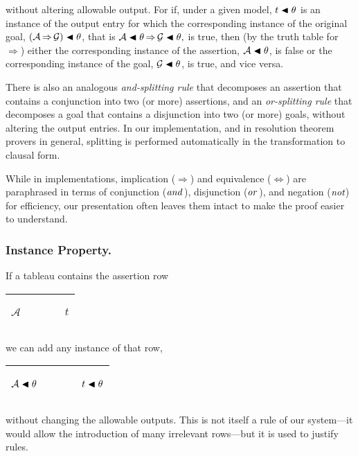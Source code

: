 \documentclass[runningheads]{llncs}
\DeclareMathOperator{\uand}{\emph{and}\,}
\DeclareMathOperator{\uor}{\emph{or}\,}
\DeclareMathOperator{\unot}{\emph{not}\kern-.0pt}
\DeclareMathOperator{\uimplies}{\Rightarrow}
\DeclareMathOperator{\uiff}{\iff}
\begin{document}
\noindent without altering allowable output. For if, under a given model, $t \blacktriangleleft \theta$ is an instance of the output entry for which the corresponding instance of the original goal, $(\mathcal{A}\uimplies\mathcal{G})\apply \theta $, that is  $\mathcal{A}\apply \theta \uimplies\mathcal{G}\apply \theta, $ is true, then (by the truth table for $\uimplies$) either the corresponding instance of the assertion, $\mathcal{A}\blacktriangleleft \theta $, is false or the corresponding instance of the goal, $\mathcal{G}\blacktriangleleft \theta $, is true, and vice versa.  

There is also an analogous
\emph{and-splitting rule} that decomposes an assertion that contains a conjunction into two (or more) assertions, and an \emph{or-splitting rule} that decomposes a goal that contains a disjunction into two (or more) goals, without altering the output entries.  In our {\SNARK} implementation, and in resolution theorem provers in general, splitting is performed automatically in the transformation to clausal form. 

While in implementations, implication ($\uimplies$) and equivalence ($\uiff$) are paraphrased in terms of conjunction ($\uand$), disjunction ($\uor$), and negation ($\unot$) for efficiency,  our presentation  often leaves them intact to make the proof easier to understand.

\subsubsection{Instance Property.} If a tableau contains the assertion row

 \begin{center}
\begin{tabular}{T}
\hline
 \begin{center}$\mathcal{A}$\end{center} & $\qquad$ & \begin{center}$t$\end{center} \\
  \hline
\end{tabular}
\end{center}

\noindent we can add any instance of that row,

 \begin{center}
\begin{tabular}{T}
\hline
 \begin{center}$\mathcal{A}\blacktriangleleft \theta$\end{center} & $\qquad$ & \begin{center}$t\blacktriangleleft\theta$\end{center} \\
  \hline
\end{tabular}
\end{center}
\noindent without changing the allowable outputs. This is not itself a rule of our system---it would allow the introduction of many irrelevant rows---but it is used to justify rules.
\end{document}
